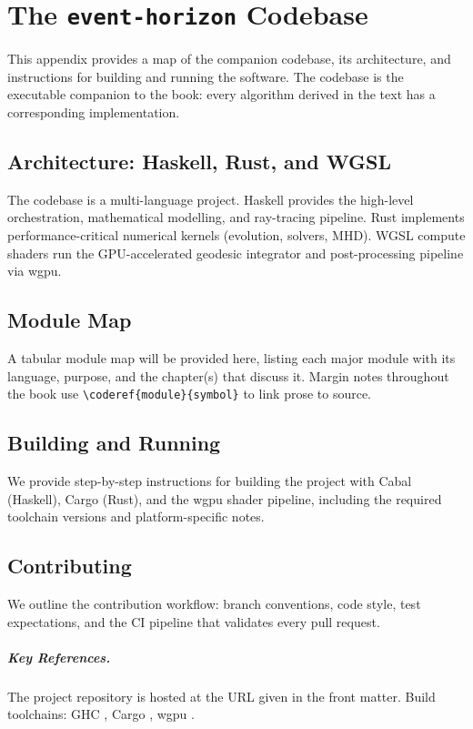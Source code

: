 \chapter{The \texttt{event-horizon} Codebase}
\label{app:codebase}

This appendix provides a map of the companion codebase, its architecture, and
instructions for building and running the software. The codebase is the
executable companion to the book: every algorithm derived in the text has a
corresponding implementation.

\section{Architecture: Haskell, Rust, and WGSL}
\label{sec:code-architecture}

The codebase is a multi-language project. Haskell provides the high-level
orchestration, mathematical modelling, and ray-tracing pipeline. Rust
implements performance-critical numerical kernels (evolution, solvers, MHD).
WGSL compute shaders run the GPU-accelerated geodesic integrator and
post-processing pipeline via wgpu.

\section{Module Map}
\label{sec:code-modules}

A tabular module map will be provided here, listing each major module with its
language, purpose, and the chapter(s) that discuss it. Margin notes throughout
the book use \verb|\coderef{module}{symbol}| to link prose to source.

\section{Building and Running}
\label{sec:code-build}

We provide step-by-step instructions for building the project with Cabal
(Haskell), Cargo (Rust), and the wgpu shader pipeline, including the
required toolchain versions and platform-specific notes.

\section{Contributing}
\label{sec:code-contributing}

We outline the contribution workflow: branch conventions, code style, test
expectations, and the CI pipeline that validates every pull request.

\paragraph{Key References.}
The project repository is hosted at the URL given in the front matter.
Build toolchains: GHC \cite{GHC}, Cargo \cite{Cargo}, wgpu \cite{wgpu}.
